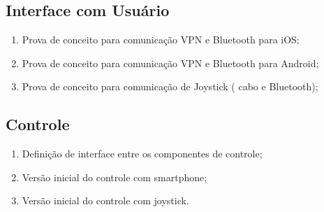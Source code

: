   \subsection{Interface com Usuário}
    \begin{enumerate}
      \item Prova de conceito para comunicação VPN e Bluetooth para iOS;
      \item Prova de conceito para comunicação VPN e Bluetooth para Android;
      \item Prova de conceito para comunicação de Joystick ( cabo e Bluetooth);
    \end{enumerate}
  \subsection{Controle}
    \begin{enumerate}
     \item Definição de interface entre os componentes de controle;
     \item Versão inicial do controle com smartphone;
     \item Versão inicial do controle com joystick.
    \end{enumerate}
